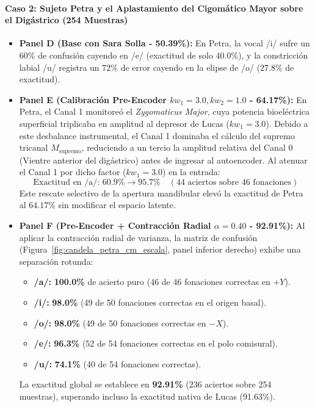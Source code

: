 \documentclass[11pt,a4paper]{article}
\begin{document}
\paragraph{Caso 2: Sujeto Petra y el Aplastamiento del Cigomático Mayor sobre el Digástrico (254 Muestras)}
\begin{itemize}
    \item \textbf{Panel D (Base con Sara Solla - 50.39\%):} En Petra, la vocal /i/ sufre un $60\%$ de confusión cayendo en /e/ (exactitud de solo $40.0\%$), y la constricción labial /u/ registra un $72\%$ de error cayendo en la elipse de /o/ ($27.8\%$ de exactitud).
    \item \textbf{Panel E (Calibración Pre-Encoder $kw_1=3.0, kw_2=1.0$ - 64.17\%):} En Petra, el Canal 1 monitoreó el \textit{Zygomaticus Major}, cuya potencia bioeléctrica superficial triplicaba en amplitud al depresor de Lucas ($kw_1 = 3.0$). Debido a este desbalance instrumental, el Canal 1 dominaba el cálculo del supremo tricanal $M_{\text{supremo}}$, reduciendo a un tercio la amplitud relativa del Canal 0 (Vientre anterior del digástrico) antes de ingresar al autoencoder. Al atenuar el Canal 1 por dicho factor ($kw_1 = 3.0$) en la entrada:
    \begin{equation}
    \text{Exactitud en /a/: } 60.9\% \longrightarrow \mathbf{95.7\%} \quad (44 \text{ aciertos sobre } 46 \text{ fonaciones})
    \end{equation}
    Este rescate selectivo de la apertura mandibular elevó la exactitud de Petra al $64.17\%$ sin modificar el espacio latente.
    \item \textbf{Panel F (Pre-Encoder + Contracción Radial $\alpha=0.40$ - 92.91\%):} Al aplicar la contracción radial de varianza, la matriz de confusión (Figura~\ref{fig:candela_petra_cm_escala}, panel inferior derecho) exhibe una separación rotunda:
    \begin{itemize}
        \item \textbf{/a/:} \textbf{100.0\%} de acierto puro (46 de 46 fonaciones correctas en $+Y$).
        \item \textbf{/i/:} \textbf{98.0\%} (49 de 50 fonaciones correctas en el origen basal).
        \item \textbf{/o/:} \textbf{98.0\%} (49 de 50 fonaciones correctas en $-X$).
        \item \textbf{/e/:} \textbf{96.3\%} (52 de 54 fonaciones correctas en el polo comisural).
        \item \textbf{/u/:} \textbf{74.1\%} (40 de 54 fonaciones correctas).
    \end{itemize}
    La exactitud global se establece en \textbf{92.91\%} (236 aciertos sobre 254 muestras), superando incluso la exactitud nativa de Lucas (91.63\%).
\end{itemize}
\end{document}
